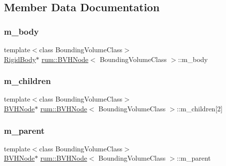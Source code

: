 \subsection{Member Data Documentation}
\mbox{\label{classrum_1_1_b_v_h_node_a24954eb90f55a8a29c6459706554c9d6}} 
\subsubsection{\texorpdfstring{m\+\_\+body}{m\_body}}
{\footnotesize\ttfamily template$<$class Bounding\+Volume\+Class$>$ \\
\mbox{\hyperlink{classrum_1_1_rigid_body}{Rigid\+Body}}$\ast$ \mbox{\hyperlink{classrum_1_1_b_v_h_node}{rum\+::\+B\+V\+H\+Node}}$<$ Bounding\+Volume\+Class $>$\+::m\+\_\+body\hspace{0.3cm}{\ttfamily [protected]}}

\mbox{\label{classrum_1_1_b_v_h_node_a681ca4a3084ba34bd54c546a7ef2a36c}} 
\subsubsection{\texorpdfstring{m\+\_\+children}{m\_children}}
{\footnotesize\ttfamily template$<$class Bounding\+Volume\+Class$>$ \\
\mbox{\hyperlink{classrum_1_1_b_v_h_node}{B\+V\+H\+Node}}$\ast$ \mbox{\hyperlink{classrum_1_1_b_v_h_node}{rum\+::\+B\+V\+H\+Node}}$<$ Bounding\+Volume\+Class $>$\+::m\+\_\+children\mbox{[}2\mbox{]}\hspace{0.3cm}{\ttfamily [protected]}}

\mbox{\label{classrum_1_1_b_v_h_node_ae69483db4fada9afde3a31393243a87d}} 
\subsubsection{\texorpdfstring{m\+\_\+parent}{m\_parent}}
{\footnotesize\ttfamily template$<$class Bounding\+Volume\+Class$>$ \\
\mbox{\hyperlink{classrum_1_1_b_v_h_node}{B\+V\+H\+Node}}$\ast$ \mbox{\hyperlink{classrum_1_1_b_v_h_node}{rum\+::\+B\+V\+H\+Node}}$<$ Bounding\+Volume\+Class $>$\+::m\+\_\+parent\hspace{0.3cm}{\ttfamily [protected]}}

